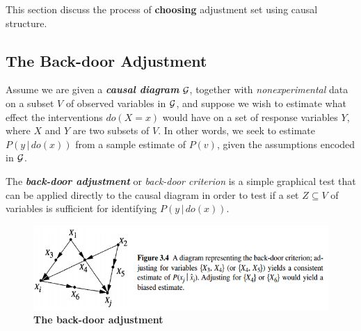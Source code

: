 \documentclass[11pt]{article}
\begin{document}
This section discuss the process of \textbf{choosing} adjustment set using causal structure.
\subsection{The Back-door Adjustment}
Assume we are given a \emph{\textbf{causal diagram}} ${\mathcal G}$, together with \emph{nonexperimental} data on a subset $V$ of observed variables in ${\mathcal G}$, and suppose we wish to estimate what effect the interventions $do(X = x)$ would have on a set of response variables $Y$, where $X$ and $Y$ are two subsets of $V$. In other words, we seek to estimate $P(y\,|\, do(x))$ from a sample estimate of $P(v)$, given the assumptions encoded in ${\mathcal G}$.

The \textbf{\emph{back-door adjustment}} or \emph{back-door criterion} \citep{pearl2000causal} is a simple graphical test that can be applied directly to the causal diagram in order to test if a set $Z \subseteq V$ of variables is sufficient for identifying $P(y \,|\,do(x))$.

\begin{figure}
\begin{minipage}[t]{1\linewidth}
  \centering
  \centerline{\includegraphics[scale = 0.6]{backdoor.png}}
\end{minipage}
\caption{\footnotesize{\textbf{The back-door adjustment  \citep{pearl2000causal}}}}
\label{fig: backdoor}
\end{figure}
\end{document}
